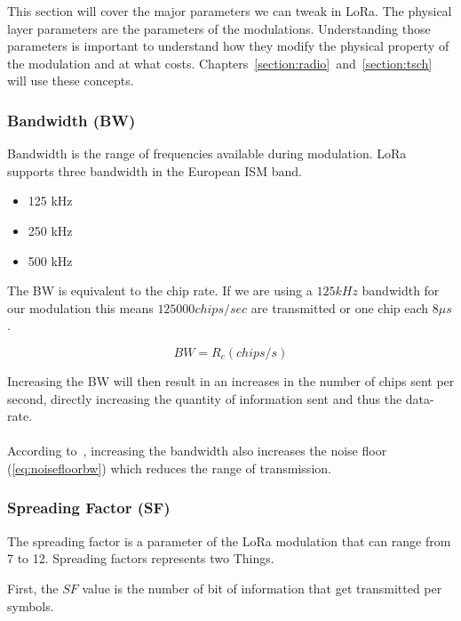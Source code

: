 This section will cover the major parameters we can tweak in LoRa.
The physical layer parameters are the parameters of the modulations.
Understanding those parameters is important to understand how they modify
the physical property of the modulation and at what costs.
Chapters~\ref{section:radio}~and~\ref{section:tsch} will use these concepts.

\subsubsection{Bandwidth (BW)\label{section:bw}}

Bandwidth is the range of frequencies available during modulation.
LoRa supports three bandwidth in the European ISM band.

\begin{itemize}
    \item 125 kHz
    \item 250 kHz
    \item 500 kHz
\end{itemize}

The BW is equivalent to the chip rate. If we are using a $125 kHz$ bandwidth
for our modulation this means $125000 chips / sec$ are transmitted or one chip
each $8 \mu s$.

\begin{equation}
  BW = R_c (chips/s)
\end{equation}

Increasing the BW will then result in an increases in the number of chips sent
per second, directly increasing the quantity of information sent and thus the
data-rate.

\paragraph{}

According to~\cite{semtech:modulationbasics}, increasing the
bandwidth also increases the noise floor (\ref{eq:noisefloorbw}) which reduces
the range of transmission.

\subsubsection{Spreading Factor (SF)}

The spreading factor is a parameter of the LoRa modulation that can range from 7 to 12.
Spreading factors represents two Things.

First, the $SF$ value is the number of bit of information that get transmitted
per symbols.

